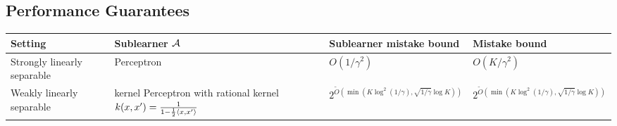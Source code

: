 \documentclass[landscape,a0a,final]{a0poster}
\begin{document}
\begin{multicols}{3}
\section*{Performance Guarantees}
\centering
\begin{tabular}{|C{4cm}|C{8cm}|C{10.5cm}|C{10.5cm}|}
\hline
Setting & Sublearner $\mathcal{A}$ & Sublearner mistake bound & Mistake bound \\
\hline
Strongly linearly separable &
\vspace*{\fill}
Perceptron
\vspace*{\fill} &
\vspace*{\fill}
$O(1/\gamma^2)$
\vspace*{\fill} &
\vspace*{\fill}
$O(K/\gamma^2)$ 
\vspace*{\fill}
\\
\hline
\vspace*{\fill}
Weakly linearly separable
\vspace*{\fill} &
\vspace*{\fill}
kernel Perceptron with rational kernel $k(x,x') = \frac{1}{1 - \frac 1 2 \left\langle x, x' \right\rangle}$
\vspace*{\fill}
&
\vspace*{\fill}
$2^{\widetilde{O}(\min(K \log^2
(1/\gamma), \sqrt{1/\gamma} \log K))}$
\vspace*{\fill}
&
\vspace*{\fill}
$2^{\widetilde{O}(\min(K \log^2
(1/\gamma), \sqrt{1/\gamma} \log K))}$
\vspace*{\fill}
 \\
\hline
\end{tabular}

\vspace*{1.5cm}

\end{multicols}
\end{document}
